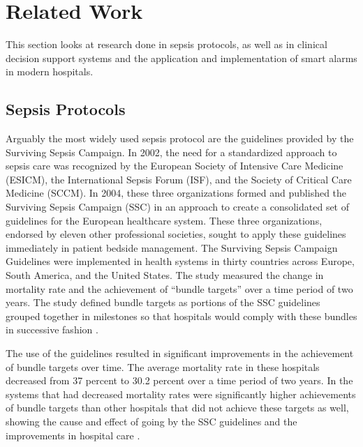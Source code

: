 \documentclass{sig-alternate}
\begin{document}
\section{Related Work}
\vspace{10pt}
\label{sec:related_work}

This section looks at research done in sepsis protocols, as well as in clinical decision support systems and the application and implementation of smart alarms in modern hospitals.

\vspace{10pt}
\subsection{Sepsis Protocols}
\label{subsec:protocols}
\vspace{10pt}

Arguably the most widely used sepsis protocol are the guidelines provided by the Surviving Sepsis Campaign. In 2002, the need for a standardized approach to sepsis care was recognized by the European Society of Intensive Care Medicine (ESICM), the International Sepsis Forum (ISF), and the Society of Critical Care Medicine (SCCM). In 2004, these three organizations formed and published the Surviving Sepsis Campaign (SSC) in an approach to create a consolidated set of guidelines for the European healthcare system. These three organizations, endorsed by eleven other professional societies, sought to apply these guidelines immediately in patient bedside management. The Surviving Sepsis Campaign Guidelines were implemented in health systems in thirty countries across Europe, South America, and the United States. The study measured the change in mortality rate and the achievement of ``bundle targets'' over a time period of two years. The study defined bundle targets as portions of the SSC guidelines grouped together in milestones so that hospitals would comply with these bundles in successive fashion \cite{ssc}. 

The use of the guidelines resulted in significant improvements in the achievement of bundle targets over time. The average mortality rate in these hospitals decreased from 37 percent to 30.2 percent over a time period of two years. In the systems that had decreased mortality rates were significantly higher achievements of bundle targets than other hospitals that did not achieve these targets as well, showing the cause and effect of going by the SSC guidelines and the improvements in hospital care \cite{ssc}.
\end{document}
